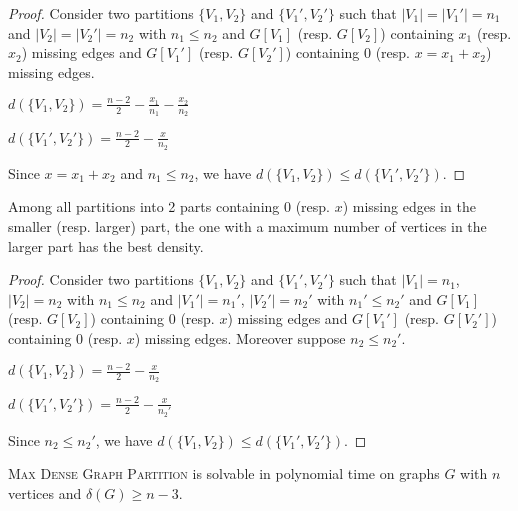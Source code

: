 \documentclass[a4paper,USenglish,cleveref, autoref]{lipics-v2021}
\newcommand\MDGP{\textsc{Max Dense Graph Partition}}
\begin{document}
 \begin{proof}
 Consider two partitions $\{V_1,V_2\}$ and $\{V_1',V_2'\}$ such that $|V_1|=|V_1'|=n_1$ and $|V_2|=|V_2'|=n_2$ with $n_1\leq n_2$ and $G[V_1]$ (resp. $G[V_2]$) containing $x_1$ (resp. $x_2$) missing edges and $G[V_1']$ (resp. $G[V_2']$) containing $0$ (resp. $x=x_1+x_2$) missing edges. 
 
 $d(\{V_1,V_2\})= \frac{n-2}{2}- \frac{x_1}{n_1} - \frac{x_2}{n_2}$
 
  $d(\{V_1',V_2'\})= \frac{n-2}{2}- \frac{x}{n_2}$
  
  Since $x=x_1+x_2$ and $n_1\leq n_2$, we have $d(\{V_1,V_2\}) \leq d(\{V_1',V_2'\})$. 
 \end{proof}

 \begin{lemma}\label{part2}
 Among all partitions into 2 parts  containing 0 (resp. $x$) missing edges in the smaller (resp. larger) part, the one with a maximum number of vertices in the larger part has the best density. \
 \end{lemma}

\begin{proof}
 Consider two partitions $\{V_1,V_2\}$ and $\{V_1',V_2'\}$ such that $|V_1|=n_1$,  $|V_2|=n_2$ with $n_1\leq n_2$ and $|V_1'|=n_1'$,  $|V_2'|=n_2'$ with $n_1'\leq n_2'$ and $G[V_1]$ (resp. $G[V_2]$) containing $0$ (resp. $x$) missing edges and $G[V_1']$ (resp. $G[V_2']$) containing $0$ (resp. $x$) missing edges. Moreover suppose $n_2\leq n_2'$.
 
 $d(\{V_1,V_2\})= \frac{n-2}{2}-  \frac{x}{n_2}$
 
  $d(\{V_1',V_2'\})= \frac{n-2}{2}- \frac{x}{n_2'}$
  
  Since  $n_2\leq n_2'$, we have $d(\{V_1,V_2\}) \leq d(\{V_1',V_2'\})$. 
\end{proof}
 
 \begin{theorem}\label{polydense}
 \MDGP{} is solvable in polynomial time on graphs $G$ with $n$ vertices and $\delta(G)\geq n-3$.
 \end{theorem}
 
\end{document}
